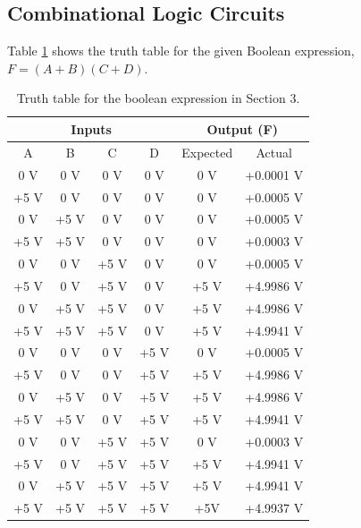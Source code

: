 \documentclass{report}
\begin{document}
	\subsection{Combinational Logic Circuits}
	Table \ref{section3} shows the truth table for the given Boolean expression, $F = (A+B)(C+D)$.
	\begin{table}[h]
		\centering
		\begin{tabular}{@{}cccc|cc@{}}
			\toprule
			\multicolumn{4}{c|}{Inputs} & \multicolumn{2}{c}{Output (F)} \\ \midrule
			A     & B     & C    & D    & Expected      & Actual         \\ \midrule
			0 V   & 0 V   & 0 V  & 0 V  & 0 V           & +0.0001 V      \\
			+5 V  & 0 V   & 0 V  & 0 V  & 0 V           & +0.0005 V      \\
			0 V   & +5 V  & 0 V  & 0 V  & 0 V           & +0.0005 V      \\
			+5 V  & +5 V  & 0 V  & 0 V  & 0 V           & +0.0003 V      \\
			0 V   & 0 V   & +5 V & 0 V  & 0 V           & +0.0005 V      \\
			+5 V  & 0 V   & +5 V & 0 V  & +5 V          & +4.9986 V      \\
			0 V   & +5 V  & +5 V & 0 V  & +5 V          & +4.9986 V      \\
			+5 V  & +5 V  & +5 V & 0 V  & +5 V          & +4.9941 V      \\
			0 V   & 0 V   & 0 V  & +5 V & 0 V           & +0.0005 V      \\
			+5 V  & 0 V   & 0 V  & +5 V & +5 V          & +4.9986 V      \\
			0 V   & +5 V  & 0 V  & +5 V & +5 V          & +4.9986 V      \\
			+5 V  & +5 V  & 0 V  & +5 V & +5 V          & +4.9941 V      \\
			0 V   & 0 V   & +5 V & +5 V & 0 V           & +0.0003 V      \\
			+5 V  & 0 V   & +5 V & +5 V & +5 V          & +4.9941 V      \\
			0 V   & +5 V  & +5 V & +5 V & +5 V          & +4.9941 V      \\
			+5 V  & +5 V  & +5 V & +5 V & +5V           & +4.9937 V      \\ \bottomrule
		\end{tabular}
		\caption{Truth table for the boolean expression in Section 3.}
		\label{section3}
	\end{table}
	
\end{document}
